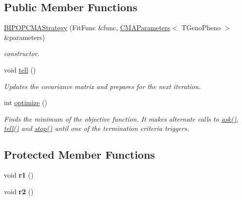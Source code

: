 \subsection*{Public Member Functions}
\begin{DoxyCompactItemize}
\item 
\hyperlink{classlibcmaes_1_1BIPOPCMAStrategy_a4c693467ab661f639e2fe2120dabcc6e}{B\-I\-P\-O\-P\-C\-M\-A\-Strategy} (Fit\-Func \&func, \hyperlink{classlibcmaes_1_1CMAParameters}{C\-M\-A\-Parameters}$<$ T\-Geno\-Pheno $>$ \&parameters)
\begin{DoxyCompactList}\small\item\em constructor. \end{DoxyCompactList}\item 
\hypertarget{classlibcmaes_1_1BIPOPCMAStrategy_adc3f5ef544a151efeb96e4d4c83e1858}{void \hyperlink{classlibcmaes_1_1BIPOPCMAStrategy_adc3f5ef544a151efeb96e4d4c83e1858}{tell} ()}\label{classlibcmaes_1_1BIPOPCMAStrategy_adc3f5ef544a151efeb96e4d4c83e1858}

\begin{DoxyCompactList}\small\item\em Updates the covariance matrix and prepares for the next iteration. \end{DoxyCompactList}\item 
int \hyperlink{classlibcmaes_1_1BIPOPCMAStrategy_a7117a7300899d1b3b734ffc6efd41054}{optimize} ()
\begin{DoxyCompactList}\small\item\em Finds the minimum of the objective function. It makes alternate calls to \hyperlink{classlibcmaes_1_1CMAStrategy_ab7266bc50732458ffcab690bc26380e6}{ask()}, \hyperlink{classlibcmaes_1_1BIPOPCMAStrategy_adc3f5ef544a151efeb96e4d4c83e1858}{tell()} and \hyperlink{classlibcmaes_1_1CMAStrategy_adc87b9c500959c800b6bc93d89432ecc}{stop()} until one of the termination criteria triggers. \end{DoxyCompactList}\end{DoxyCompactItemize}
\subsection*{Protected Member Functions}
\begin{DoxyCompactItemize}
\item 
\hypertarget{classlibcmaes_1_1BIPOPCMAStrategy_a7285772ab91aa5da1bbb20485ed6136d}{void {\bfseries r1} ()}\label{classlibcmaes_1_1BIPOPCMAStrategy_a7285772ab91aa5da1bbb20485ed6136d}

\item 
\hypertarget{classlibcmaes_1_1BIPOPCMAStrategy_a1bf830b35350a9c9d63dd717dfab7c73}{void {\bfseries r2} ()}\label{classlibcmaes_1_1BIPOPCMAStrategy_a1bf830b35350a9c9d63dd717dfab7c73}

\end{DoxyCompactItemize}
